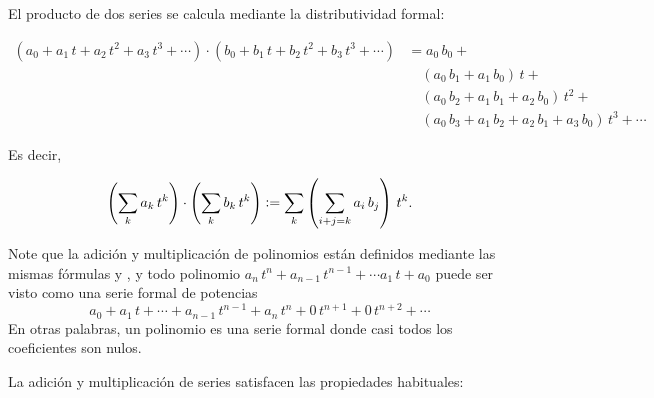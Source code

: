 \documentclass{article}
\begin{document}
El producto de dos series se calcula mediante la distributividad formal:

\begin{align*}
(a_0 + a_1\,t + a_2\,t^2 + a_3\,t^3 + \cdots)\cdot (b_0 + b_1\,t + b_2\,t^2 + b_3\,t^3 + \cdots) & = a_0\,b_0 + ~\\
 & \quad (a_0\,b_1 + a_1\,b_0)\,t + ~ \\
 & \quad (a_0\,b_2 + a_1\,b_1 + a_2\,b_0)\,t^2 + ~ \\
 & \quad (a_0\,b_3 + a_1\,b_2 + a_2\,b_1 + a_3\,b_0)\,t^3 + \cdots
\end{align*}

\noindent Es decir,

\begin{equation}
\label{multiplicacion-de-series-formales}
\left(\sum_k a_k\,t^k\right) \cdot \left(\sum_k b_k\,t^k\right) \mathrel{\mathop:}= \sum_k \left(\sum_{i+j=k} a_i\,b_j\right)\,t^k.
\end{equation}

Note que la adición y multiplicación de polinomios están definidos mediante las mismas fórmulas  y , y todo polinomio $a_n\,t^n + a_{n-1}\,t^{n-1} + \cdots a_1\,t + a_0$ puede ser visto como una serie formal de potencias
$$a_0 + a_1\,t + \cdots + a_{n-1}\,t^{n-1} + a_n\,t^n + 0\,t^{n+1} + 0\,t^{n+2} + \cdots$$
En otras palabras, un polinomio es una serie formal donde casi todos los coeficientes son nulos.

La adición y multiplicación de series satisfacen las propiedades habituales:
\end{document}
